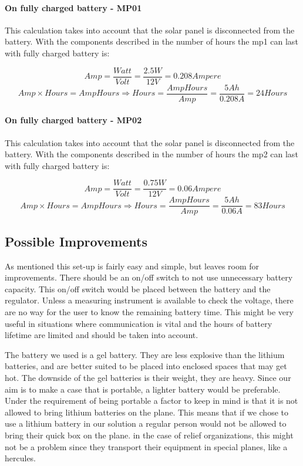 \paragraph{On fully charged battery - MP01}
This calculation takes into account that the solar panel is disconnected from the battery. With the components described in  the number of hours the \gls{mp1} can last with fully charged battery is: 

$$Amp = \frac{Watt}{Volt} = \frac{2.5 W}{12 V} = 0.208 Ampere$$
$$Amp\times Hours = AmpHours \Rightarrow Hours = \frac{AmpHours}{Amp} = \frac{5 Ah}{0.208 A} = 24 Hours$$

\paragraph{On fully charged battery - MP02}
This calculation takes into account that the solar panel is disconnected from the battery. With the components described in  the number of hours the \gls{mp2} can last with fully charged battery is: 

$$Amp = \frac{Watt}{Volt} = \frac{0.75 W}{12 V} = 0.06 Ampere$$
$$Amp\times Hours = AmpHours \Rightarrow Hours = \frac{AmpHours}{Amp} = \frac{5 Ah}{0.06 A} = 83 Hours$$


\subsection{Possible Improvements}
As mentioned this set-up is fairly easy and simple, but leaves room for improvements. There should be an on/off switch to not use unnecessary battery capacity. This on/off switch would be placed between the battery and the regulator. Unless a measuring instrument is available to check the voltage, there are no way for the user to know the remaining battery time. This might be very useful in situations where communication is vital and the hours of battery lifetime are limited and should be taken into account. 

The battery we used is a gel battery. They are less explosive than the lithium batteries, and are better suited to be placed into enclosed spaces that may get hot. The downside of the gel batteries is their weight, they are heavy. Since our aim is to make a case that is portable, a lighter battery would be preferable. Under the requirement of being portable a factor to keep in mind is that it is not allowed to bring lithium batteries on the plane. This means that if we chose to use a lithium battery in our solution a regular person would not be allowed to bring their \gls{quick} box on the plane. in the case of relief organizations, this might not be a problem since they transport their equipment in special planes, like a hercules. 

